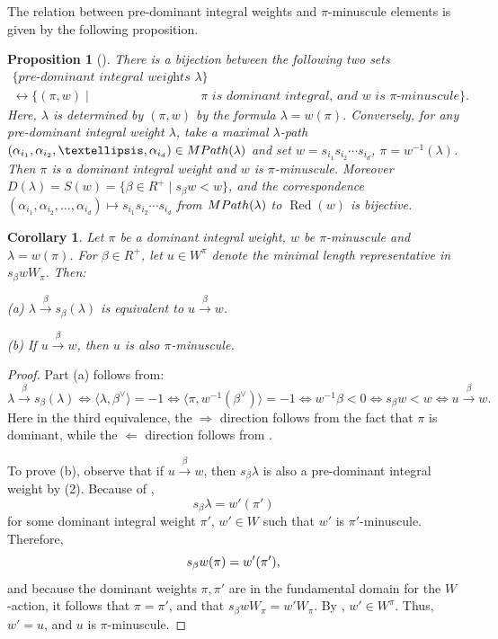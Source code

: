 \documentclass[11pt]{article}
\newtheorem{prop}[theo]{Proposition}
\newtheorem{corol}[theo]{Corollary}
\theoremstyle{definition}
\numberwithin{equation}{section}
\DeclareMathOperator{\Red}{Red}
\begin{document}
The relation between pre-dominant integral weights and $\pi$-minuscule elements is given by the following proposition.
\begin{prop}[{\cite[Propositions 10.1 and 10.3]{nakada:colored}}]\label{prop:pre-dom}
	There is a bijection between the following two sets
	\begin{align*}
		\{\textit{pre-dominant integral weights } \lambda\}&\\
		\longleftrightarrow  \{(\pi, w)\mid & \pi \textit{ is dominant integral, and }w \textit{ is } \pi \textit{-minuscule}\}.
	\end{align*}
	Here, $\lambda$ is determined by $(\pi,w)$ by the formula $\lambda=w(\pi)$.
	Conversely, for any pre-dominant integral weight $\lambda$,
	take a maximal $\lambda$-path 
	$(\alpha_{i_1},\alpha_{i_2},\ldots,\alpha_{i_d})\in {\rm MPath}(\lambda)$ and
	set $w=s_{i_1} s_{i_2}\cdots s_{i_d}$, $\pi=w^{-1}(\lambda)$.
	Then $\pi$ is a dominant integral weight and $w$ is $\pi$-minuscule.
	Moreover $D(\lambda)= S(w)=\{\beta\in R^{+}\mid s_\beta w<w\}$, and the correspondence $(\alpha_{i_1},\alpha_{i_2},\ldots,\alpha_{i_d})\mapsto s_{i_1} s_{i_2}\cdots s_{i_d}$ from ${\rm MPath}(\lambda)$ to $\Red(w)$ is bijective.
\end{prop}

\begin{corol}\label{lem:wminuscule}
	Let $\pi$ be a dominant integral weight, $w$ be $\pi$-minuscule and \mbox{$\lambda=w(\pi)$}. For $\beta\in R^+$, let $u\in W^\pi$ denote the minimal length representative in $s_\beta wW_\pi$. Then: 
	
	(a) $\lambda\overset{\beta}{\to} s_\beta(\lambda)$ is equivalent to $u \overset{\beta}{\to} w$.
	
	(b) If $u \overset{\beta}{\to} w$, then $u$ is also $\pi$-minuscule.
\end{corol}
\begin{proof} Part (a) follows from:
	{\small \[\lambda\overset{\beta}{\to} s_\beta(\lambda)\Leftrightarrow \langle\lambda,\beta^\vee\rangle=-1\Leftrightarrow \langle\pi,w^{-1}(\beta^\vee)\rangle=-1 \Leftrightarrow w^{-1}\beta<0\Leftrightarrow  s_\beta w<w\Leftrightarrow u\overset{\beta}{\to} w.\]}Here in the third equivalence, the $\Rightarrow$ direction follows from the fact that $\pi$ is dominant, while the $\Leftarrow$ direction follows from . 
	
	To prove (b), observe that if $u\overset{\beta}{\to} w$, then $s_\beta\lambda$ is also a pre-dominant integral weight by (2). Because of ,
	\[s_\beta\lambda=w'(\pi')\]
	for some dominant integral weight $\pi'$, $w'\in W$ such that $w'$ is $\pi'$-minuscule. Therefore,
	\[s_\beta w(\pi)=w'(\pi') \/,\]
	and because the dominant 
	weights $\pi, \pi'$ are in the fundamental 
	domain for the $W$-action, it follows that $\pi=\pi'$, and that $s_\beta wW_\pi=w'W_\pi$. By , $w'\in W^\pi$. Thus, $w'=u$, and $u$ is $\pi$-minuscule.
\end{proof}
\end{document}
